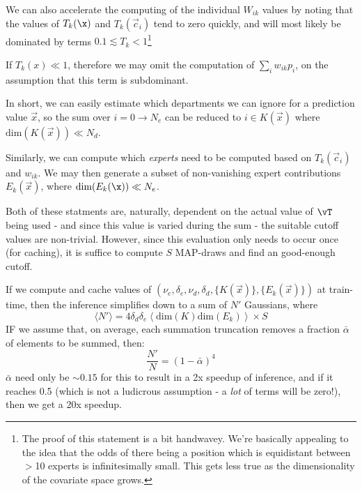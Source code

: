         We can also accelerate the computing of the individual $W_{ik}$ values by noting that the values of $T_k(\x)$ and $T_k(\vec{c}_i)$ tend to zero quickly, and will most likely be dominated by terms $0.1 \lesssim T_k < 1$\footnote{The proof of this statement is a bit handwavey. We're basically appealing to the idea that the odds of there being a position which is equidistant between $>$10 experts is infinitesimally small. This gets less true as the dimensionality of the covariate space grows.}
        
        If $T_k(x) \ll 1$, therefore we may omit the computation of $\sum_i w_{ik} p_i$, on the assumption that this term is subdominant. 
        
        In short, we can easily estimate which departments we can ignore for a prediction value $\vec{x}$, so the sum over $i = 0 \to N_e$ can be reduced to $i \in K(\vec{x})$ where $\text{dim}(K(\vec{x})) \ll N_d$. 

        Similarly, we can compute which \textit{experts} need to be computed based on $T_k(\vec{c}_i)$ and $w_{ik}$. We may then generate a subset of non-vanishing expert contributions $E_k(\vec{x})$, where $\text{dim}(E_k(\x))\ll N_e$.

        Both of these statments are, naturally, dependent on the actual value of $\vT$ being used - and since this value is varied during the sum - the suitable cutoff values are non-trivial. However, since this evaluation only needs to occur once (for caching), it is suffice to compute $S$ MAP-draws and find an good-enough cutoff. 

        If we compute and cache values of $(\nu_e,\delta_e, \nu_d,\delta_d, \{K(\vec{x})\}, \{E_k(\vec{x})\})$ at train-time, then the inference simplifies down to a sum of $N'$ Gaussians, where
        \begin{equation}
            \langle N' \rangle = 4 \delta_d \delta_e \left\langle \text{dim}(K) \text{dim}(E_k)\right\rangle \times S
        \end{equation}
        IF we assume that, on average, each summation truncation removes a fraction $\bar{\alpha}$ of elements to be summed, then:
        \begin{equation}
            \frac{N'}{N}= \left(1 - \bar{\alpha}\right)^4
        \end{equation}
        $\bar{\alpha}$ need only be $\sim 0.15$ for this to result in a 2x speedup of inference, and if it reaches 0.5 (which is not a ludicrous assumption - a \textit{lot} of terms will be zero!), then we get a 20x speedup. 